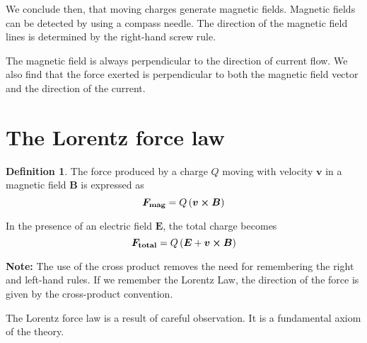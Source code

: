 \documentclass[12pt,chapterprefix=false,dvipsnames]{scrbook}
\theoremstyle{dotless}
\theoremstyle{definition}
\newtheorem{protodefinition}{Definition}[section]
\newenvironment{definition}
{\colorlet{shadecolor}{black!15}\begin{shaded}\begin{protodefinition}}
			{\end{protodefinition}\end{shaded}}
\begin{document}
We conclude then, that moving charges generate magnetic fields.
Magnetic fields can be detected by using a compass needle. The
direction of the magnetic field lines is determined by the
right-hand screw rule.

The magnetic field is always perpendicular to the direction of
current flow. We also find that the force exerted is
perpendicular to both the magnetic field vector and the
direction of the current.

\section{The Lorentz force law}%
\label{sec:the_lorentz_force_law}

\begin{definition}

	The force produced by a charge $Q$ moving
	with velocity $\bm{v}$ in a magnetic field
	$\bm{B}$ is expressed as
	\begin{equation}
		\bm{F_{\mathrm{mag}}}
		=
		Q\left(\bm{v}\cross\bm{B}\right)
	\end{equation}

	In the presence of an electric field $\bm{E}$,
	the total charge becomes
	\begin{equation}
		\bm{F_{\mathrm{total}}}
		=
		Q\left(\bm{E} + \bm{v}\cross\bm{B}\right)
	\end{equation}
\end{definition}

\textbf{Note:} The use of the cross product removes
the need for remembering the right and left-hand rules. If we
remember the Lorentz Law, the direction of the force is given by
the cross-product convention.

The Lorentz force law is a result of careful observation. It is
a fundamental axiom of the theory.
\end{document}
